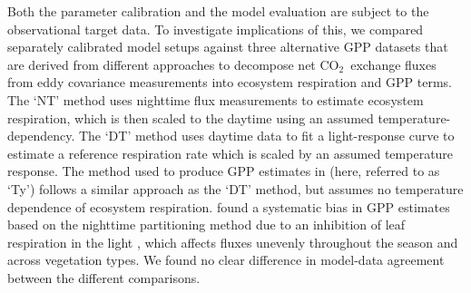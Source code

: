 \documentclass{myreport}
\newcommand{\coo}{CO$_2$}
\begin{document}
Both the parameter calibration and the model evaluation are subject to the observational target data. To investigate implications of this, we compared separately calibrated model setups against three alternative GPP datasets that are derived from different approaches to decompose net \coo\ exchange fluxes from eddy covariance measurements into ecosystem respiration and GPP terms. The `NT' method \citep{Reichstein2005-mp} uses nighttime flux measurements to estimate ecosystem respiration, which is then scaled to the daytime using an assumed temperature-dependency. The `DT' method \citep{lasslop10} uses daytime data to fit a light-response curve to estimate a reference respiration rate which is scaled by an assumed temperature response. The method used to produce GPP estimates in \cite{wang17rs} (here, referred to as `Ty') follows a similar approach as the `DT' method, but assumes no temperature dependence of ecosystem respiration. \cite{keenan19natee} found a systematic bias in GPP estimates based on the nighttime partitioning method due to an inhibition of leaf respiration in the light \citep{kok49, wehr16}, which affects fluxes unevenly throughout the season and across vegetation types. We found no clear difference in model-data agreement between the different comparisons.
\end{document}
